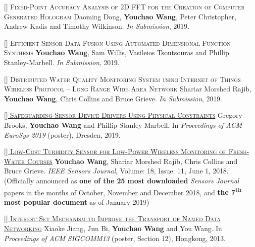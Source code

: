 \documentclass[11pt,a4paper]{moderncv}
\begin{document}
\addtocounter{counter}{1}

\textsc{[] Fixed-Point Accuracy Analysis of 2D FFT for the Creation of Computer Generated Hologram}
\newline  Daoming Dong, \textbf{Youchao Wang}, Peter Christopher, Andrew Kadis and Timothy Wilkinson. \textit{In Submission}, 2019.

\addtocounter{counter}{1}

\textsc{[] Efficient Sensor Data Fusion Using Automated Dimensional Function Synthesis}
\newline  \textbf{Youchao Wang}, Sam Willis, Vasileios Tsoutsouras and Phillip Stanley-Marbell. \textit{In Submission}, 2019.

\addtocounter{counter}{1}

\textsc{[] Distributed Water Quality Monitoring System using Internet of Things Wireless Protocol – Long Range Wide Area Network}
\newline  Shariar Morshed Rajib, \textbf{Youchao Wang}, Chris Collins and Bruce Grieve. \textit{In Submission}, 2019.

\addtocounter{counter}{1}

\href{https://www.eurosys2019.org/wp-content/uploads/2019/03/eurosys19posters-abstract77.pdf}{\textsc{[] Safeguarding Sensor Device Drivers Using Physical Constraints}}
\newline  Gregory Brooks, \textbf{Youchao Wang} and Phillip Stanley-Marbell. In \textit{Proceedings of ACM EuroSys 2019} (poster), Dresden, 2019.

\addtocounter{counter}{1}

\href{https://ieeexplore.ieee.org/document/8337739}{\textsc{[] Low-Cost Turbidity Sensor for Low-Power Wireless Monitoring of Fresh-Water Courses}}
\newline  \textbf{Youchao Wang}, Shariar Morshed Rajib, Chris Collins and Bruce Grieve. \textit{IEEE Sensors Journal}, Volume: 18, Issue: 11, June 1, 2018. (Officially announced as \textbf{one of the 25 most downloaded} \textit{Sensors Journal} papers in the months of October, November and December 2018, and \textbf{the 7\textsuperscript{th} most popular document} as of January 2019)

\addtocounter{counter}{1}

\href{https://ndnsim.net/2.3/ndnsim-research-papers.html}{\textsc{[] Interest Set Mechanism to Improve the Transport of Named Data Networking}}
\newline  Xiaoke Jiang, Jun Bi, \textbf{Youchao Wang} and You Wang. In \textit{Proceedings of ACM SIGCOMM13} (poster, Section 12), Hongkong, 2013. 
\end{document}
